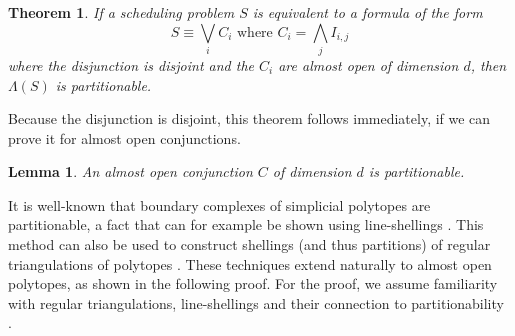 \documentclass[12pt,reqno]{amsart}
\numberwithin{definition}{section}
\newtheorem{theorem}[definition]{Theorem}
\newtheorem{lemma}[definition]{Lemma}
\theoremstyle{definition}
\newcommand{\allow}{\Lambda} %
\begin{document}
\begin{theorem}
If a scheduling problem $S$ is equivalent to a formula of the form
\[
  S \equiv \bigvee_i C_i \text{ where } C_i = \bigwedge_j I_{i,j}
\]
where the disjunction is disjoint and the $C_i$ are almost open of dimension $d$, then $\allow(S)$ is partitionable.
\end{theorem}

Because the disjunction is disjoint, this theorem follows immediately, if we can prove it for almost open conjunctions.

\begin{lemma}
\label{lem:almost-open}
An almost open conjunction $C$ of dimension $d$ is partitionable.
\end{lemma}

It is well-known that boundary complexes of simplicial polytopes are partitionable, a fact that can for example be shown using line-shellings \cite{Bruggesser1971}. This method can also be used to construct shellings (and thus partitions) of regular triangulations of polytopes \cite[Corollary~8.14]{Ziegler1995}. These techniques extend naturally to almost open polytopes, as shown in the following proof. For the proof, we assume familiarity with regular triangulations, line-shellings and their connection to partitionability \cite{DeLoera2010,Lee2004,Ziegler1995}.
\end{document}
